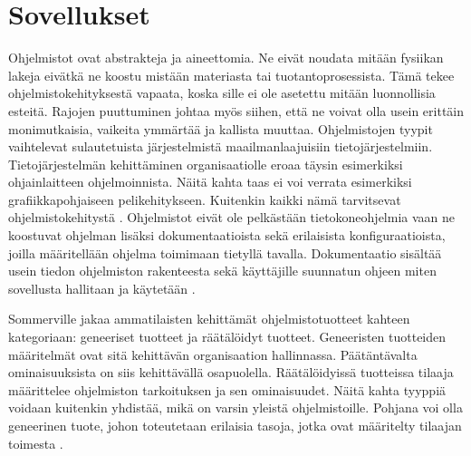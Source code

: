 \documentclass[utf8]{gradu3}
\begin{document}
\section{Sovellukset}
Ohjelmistot ovat abstrakteja ja aineettomia. Ne eivät noudata mitään fysiikan lakeja eivätkä ne koostu mistään materiasta tai tuotantoprosessista. Tämä tekee ohjelmistokehityksestä vapaata, koska sille ei ole asetettu mitään luonnollisia esteitä. Rajojen puuttuminen johtaa myös siihen, että ne voivat olla usein erittäin monimutkaisia, vaikeita ymmärtää ja kallista muuttaa. Ohjelmistojen tyypit vaihtelevat sulautetuista järjestelmistä maailmanlaajuisiin tietojärjestelmiin. Tietojärjestelmän kehittäminen organisaatiolle eroaa täysin esimerkiksi ohjainlaitteen ohjelmoinnista. Näitä kahta taas ei voi verrata esimerkiksi grafiikkapohjaiseen pelikehitykseen. Kuitenkin kaikki nämä tarvitsevat ohjelmistokehitystä \parencite[s.1-10]{Sommerville}. Ohjelmistot eivät ole pelkästään tietokoneohjelmia vaan ne koostuvat ohjelman lisäksi dokumentaatioista sekä erilaisista konfiguraatioista, joilla määritellään ohjelma toimimaan tietyllä tavalla. Dokumentaatio sisältää usein tiedon ohjelmiston rakenteesta sekä käyttäjille suunnatun ohjeen miten sovellusta hallitaan ja käytetään \parencite[s.1-10]{Sommerville}. 

Sommerville jakaa ammatilaisten kehittämät ohjelmistotuotteet kahteen kategoriaan: geneeriset tuotteet ja räätälöidyt tuotteet. Geneeristen tuotteiden määritelmät ovat sitä kehittävän organisaation hallinnassa. Päätäntävalta ominaisuuksista on siis kehittävällä osapuolella. Räätälöidyissä tuotteissa tilaaja määrittelee ohjelmiston tarkoituksen ja sen ominaisuudet. Näitä kahta tyyppiä voidaan kuitenkin yhdistää, mikä on varsin yleistä ohjelmistoille. Pohjana voi olla geneerinen tuote, johon toteutetaan erilaisia tasoja, jotka ovat määritelty tilaajan toimesta \parencite[s.1-10]{Sommerville}.
\end{document}
